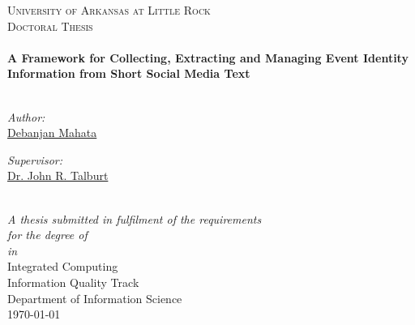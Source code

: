 \documentclass[11pt, oneside]{Thesis} %
\begin{document}
\begin{titlepage}
\begin{center}

\textsc{\LARGE University of Arkansas at Little Rock}\\[1.5cm] %
\textsc{\Large Doctoral Thesis}\\[0.5cm] %

\HRule \\[0.4cm] %
{\huge \bfseries A Framework for Collecting, Extracting and Managing Event Identity Information from Short Social Media Text}\\[0.4cm] %
\HRule \\[1.5cm] %
 
\begin{minipage}{0.4\textwidth}
\begin{flushleft} \large
\emph{Author:}\\
\href{https://sites.google.com/a/ualr.edu/debanjan-mahata/home}{Debanjan Mahata} %
\end{flushleft}
\end{minipage}
\begin{minipage}{0.4\textwidth}
\begin{flushright} \large
\emph{Supervisor:} \\
\href{http://ualr.edu/technologyinnovation/faculty/john-talburt/}{Dr. John R. Talburt} %
\end{flushright}
\end{minipage}\\[3cm]
 
\large \textit{A thesis submitted in fulfilment of the requirements\\ for the degree of \degreename}\\[0.3cm] %
\textit{in}\\[0.4cm]
Integrated Computing \\ Information Quality Track \\ Department of Information Science \\[2cm] %
 
{\large \today}\\[4cm] %
 
\vfill
\end{center}

\end{titlepage}
\end{document}
